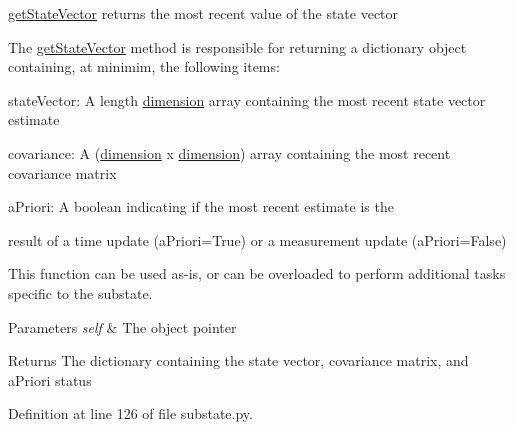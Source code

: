 \hyperlink{classmodest_1_1substates_1_1substate_1_1SubState_aa18c8238415131b4b63cef0e4b2ff9fd}{get\+State\+Vector} returns the most recent value of the state vector 

The \hyperlink{classmodest_1_1substates_1_1substate_1_1SubState_aa18c8238415131b4b63cef0e4b2ff9fd}{get\+State\+Vector} method is responsible for returning a dictionary object containing, at minimim, the following items\+:


\begin{DoxyItemize}
\item \textquotesingle{}state\+Vector\textquotesingle{}\+: A length \hyperlink{classmodest_1_1substates_1_1substate_1_1SubState_ab9027f6d1d7d57c47731612f519b7ee6}{dimension} array containing the most recent state vector estimate
\item \textquotesingle{}covariance\textquotesingle{}\+: A (\hyperlink{classmodest_1_1substates_1_1substate_1_1SubState_ab9027f6d1d7d57c47731612f519b7ee6}{dimension} x \hyperlink{classmodest_1_1substates_1_1substate_1_1SubState_ab9027f6d1d7d57c47731612f519b7ee6}{dimension}) array containing the most recent covariance matrix
\item \textquotesingle{}a\+Priori\textquotesingle{}\+: A boolean indicating if the most recent estimate is the
\item result of a time update (a\+Priori=True) or a measurement update (a\+Priori=False)
\end{DoxyItemize}

This function can be used as-\/is, or can be overloaded to perform additional tasks specific to the substate.


\begin{DoxyParams}{Parameters}
{\em self} & The object pointer\\
\hline
\end{DoxyParams}
\begin{DoxyReturn}{Returns}
The dictionary containing the state vector, covariance matrix, and a\+Priori status 
\end{DoxyReturn}


Definition at line 126 of file substate.\+py.

